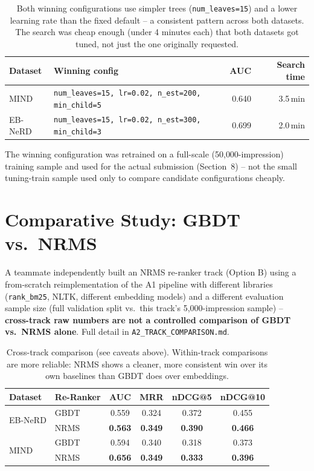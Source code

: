 \documentclass[11pt,a4paper]{article}
\begin{document}
\begin{table}[h]
\centering\small
\begin{tabularx}{\textwidth}{l X r r}
\toprule
\textbf{Dataset} & \textbf{Winning config} & \textbf{AUC} & \textbf{Search time} \\
\midrule
MIND & \texttt{num\_leaves=15, lr=0.02, n\_est=200, min\_child=5} & 0.640 & 3.5\,min \\
EB-NeRD & \texttt{num\_leaves=15, lr=0.02, n\_est=300, min\_child=3} & 0.699 & 2.0\,min \\
\bottomrule
\end{tabularx}
\caption{Both winning configurations use simpler trees (\texttt{num\_leaves=15}) and a
lower learning rate than the fixed default -- a consistent pattern across both
datasets. The search was cheap enough (under 4 minutes each) that both datasets got
tuned, not just the one originally requested.}
\label{tab:tuning}
\end{table}

The winning configuration was retrained on a full-scale (50{,}000-impression) training
sample and used for the actual submission (Section~8) -- not the small tuning-train
sample used only to compare candidate configurations cheaply.

\section{Comparative Study: GBDT vs.\ NRMS}

A teammate independently built an NRMS re-ranker track (Option B) using a
from-scratch reimplementation of the A1 pipeline with different libraries
(\texttt{rank\_bm25}, NLTK, different embedding models) and a different evaluation
sample size (full validation split vs.\ this track's 5{,}000-impression sample) --
\textbf{cross-track raw numbers are not a controlled comparison of GBDT vs.\ NRMS
alone}. Full detail in \texttt{A2\_TRACK\_COMPARISON.md}.

\begin{table}[h]
\centering\small
\begin{tabular}{ll cccc}
\toprule
\textbf{Dataset} & \textbf{Re-Ranker} & \textbf{AUC} & \textbf{MRR} & \textbf{nDCG@5} & \textbf{nDCG@10} \\
\midrule
\multirow{2}{*}{EB-NeRD}
 & GBDT  & 0.559 & 0.324 & 0.372 & 0.455 \\
 & NRMS  & \textbf{0.563} & \textbf{0.349} & \textbf{0.390} & \textbf{0.466} \\
\midrule
\multirow{2}{*}{MIND}
 & GBDT  & 0.594 & 0.340 & 0.318 & 0.373 \\
 & NRMS  & \textbf{0.656} & \textbf{0.349} & \textbf{0.333} & \textbf{0.396} \\
\bottomrule
\end{tabular}
\caption{Cross-track comparison (see caveats above). Within-track comparisons are more
reliable: NRMS shows a cleaner, more consistent win over its own baselines than GBDT
does over embeddings.}
\label{tab:cross}
\end{table}
\end{document}
